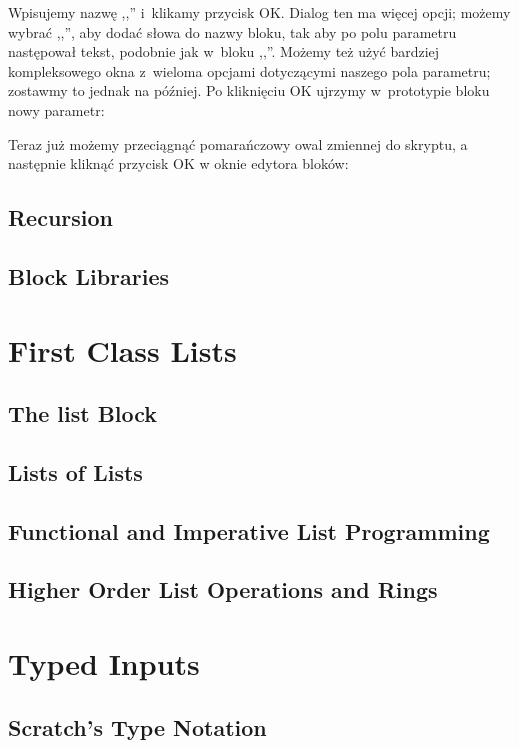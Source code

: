 \documentclass[a4paper]{report}
\begin{document}

Wpisujemy nazwę ,,'' i~klikamy przycisk OK. Dialog ten ma więcej opcji; możemy wybrać ,,'', aby dodać słowa do nazwy bloku, tak aby po polu parametru następował tekst, podobnie jak w~bloku ,,''. Możemy też użyć bardziej kompleksowego okna z~wieloma opcjami dotyczącymi naszego pola parametru; zostawmy to jednak na później. Po kliknięciu OK ujrzymy w~prototypie bloku nowy parametr:\nopagebreak


Teraz już możemy przeciągnąć pomarańczowy owal zmiennej do skryptu, a następnie kliknąć przycisk OK w oknie edytora bloków:\nopagebreak


\section{Recursion}
\section{Block Libraries}
\chapter{First Class Lists}
\section{The list Block}
\section{Lists of Lists}
\section{Functional and Imperative List Programming}
\section{Higher Order List Operations and Rings}
\chapter{Typed Inputs}
\section{Scratch's Type Notation}
\end{document}
